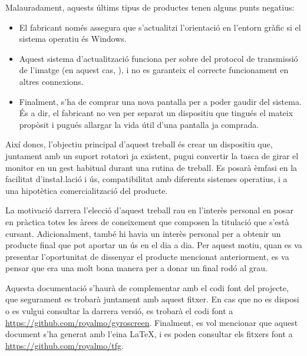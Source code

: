 Malauradament, aquests últims tipus de productes tenen alguns punts negatius:
\begin{itemize}
    \item El fabricant només assegura que s'actualitzi l'orientació en l'entorn
    gràfic si el sistema operatiu és Windows.
    \item Aquest sistema d'actualització funciona per sobre del protocol de
    transmissió de l'imatge (en aquest cas, ), i no es garanteix el correcte
    funcionament en altres connexions.
    \item Finalment, s'ha de comprar una nova pantalla per a poder gaudir del
    sistema. És a dir, el fabricant no ven per separat un dispositiu que tingués
    el mateix propòsit i pugués allargar la vida útil d'una pantalla ja
    comprada.
\end{itemize}

Així doncs, l'objectiu principal d'aquest treball és crear un dispositiu que,
juntament amb un suport rotatori ja existent, pugui convertir la tasca de girar
el monitor en un gest habitual durant una rutina de treball. Es posarà èmfasi en
la facilitat d'insta\l.lació i ús, compatibilitat amb diferents sistemes
operatius, i a una hipotètica comercialització del producte.

La motivació darrera l'elecció d'aquest treball rau en l'interès personal en
posar en pràctica totes les àrees de coneixement que composen la titulació que
s'està cursant. Adicionalment, també hi havia un interès personal per a obtenir
un producte final que pot aportar un ús en el dia a dia. Per aquest motiu, quan
es va presentar l'oportunitat de dissenyar el producte mencionat anteriorment,
es va pensar que era una molt bona manera per a donar un final rodó al grau.

Aquesta documentació s'haurà de complementar amb el codi font del projecte, que
segurament es trobarà juntament amb aquest fitxer. En cas que no es disposi o
es vulgui consultar la darrera versió, es trobarà el codi font a
\url{https://github.com/royalmo/gyroscreen}.
Finalment, es vol mencionar que aquest document s'ha generat amb l'eina \LaTeX,
i es poden consultar els fitxers font a \url{https://github.com/royalmo/tfg}.
